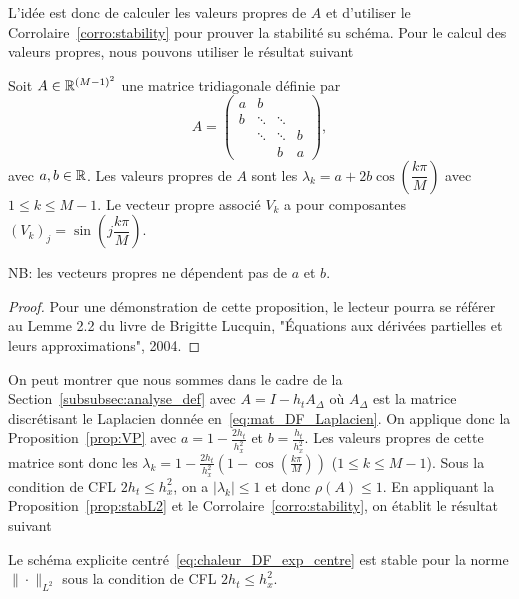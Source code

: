 \documentclass[12pt,a4paper,twoside]{article}
\begin{document}
L'id\'ee est donc de calculer les valeurs propres de $A$ et d'utiliser
le Corrolaire~\ref{corro:stability} pour prouver la stabilit\'e su sch\'ema.
Pour le calcul des valeurs propres, nous pouvons utiliser le r\'esultat suivant
\begin{proposition}
  \label{prop:VP}
  Soit $A \in \mathbb{R}^{(M-1)^2}$ une matrice tridiagonale d\'efinie par
  \begin{equation*}
    A =
    \begin{pmatrix}
      a & b &
      \\
      b & \ddots & \ddots
      \\
      & \ddots & \ddots & b
      \\
      & & b & a
    \end{pmatrix} ,
  \end{equation*}
  avec $a, b \in \mathbb{R}$. Les valeurs propres de $A$ sont les 
  $\lambda_k = a + 2b \cos \left( \dfrac{k \pi}{M} \right)$ avec $1 \leq k \leq M-1$.
  Le vecteur propre associ\'e $V_k$ a pour composantes 
  $(V_k)_j = \sin \left( j \dfrac{k \pi}{M} \right)$.

  NB: les vecteurs propres ne d\'ependent pas de $a$ et $b$.
\end{proposition}


\begin{proof}
  Pour une d\'emonstration de cette proposition, le lecteur pourra se r\'ef\'erer au 
  Lemme 2.2 du livre 
  de Brigitte Lucquin, "\'Equations aux d\'eriv\'ees partielles et leurs approximations", 2004.
\end{proof}


On peut montrer que nous sommes dans le cadre de la Section~\ref{subsubsec:analyse_def}
avec $A = I - h_t A_{\Delta}$ o\`u $A_{\Delta}$ est la matrice discr\'etisant le Laplacien
donn\'ee en~\eqref{eq:mat_DF_Laplacien}.
On applique donc la Proposition~\ref{prop:VP} avec $a = 1 - \frac{2h_t}{h_x^2}$
et $b = \frac{h_t}{h_x^2}$.
Les valeurs propres de cette matrice sont donc les
$\lambda_k = 1 - \frac{2h_t}{h_x^2}(1-\cos(\frac{k \pi}{M}))$ ($1 \leq k \leq M-1$).
Sous la condition de CFL $2h_t \leq h_x^2$, on a $| \lambda_k | \leq 1$ et donc
$\rho(A) \leq 1$.
En appliquant la Proposition~\ref{prop:stabL2} et le Corrolaire~\ref{corro:stability}, on
\'etablit le r\'esultat suivant
\begin{proposition}
  Le sch\'ema explicite centr\'e~\eqref{eq:chaleur_DF_exp_centre}
  est stable pour la norme $\| \cdot \|_{L^2}$ sous la condition de CFL $2 h_t \leq h_x^2$.
\end{proposition}
\end{document}
